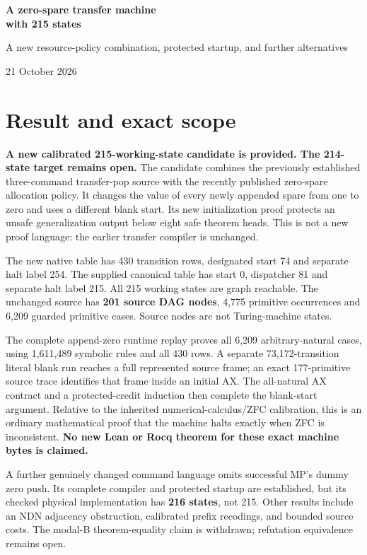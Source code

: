 \documentclass[11pt]{article}
\begin{document}
{\LARGE\bfseries A zero-spare transfer machine\\with 215 states}\par
\vspace{5pt}
{\large A new resource-policy combination, protected startup, and further alternatives}\par
21 October 2026\par

\section{Result and exact scope}
\textbf{A new calibrated 215-working-state candidate is provided. The 214-state target remains open.} The candidate combines the previously established three-command transfer-pop source with the recently published zero-spare allocation policy. It changes the value of every newly appended spare from one to zero and uses a different blank start. Its new initialization proof protects an unsafe generalization output below eight safe theorem heads. This is not a new proof language: the earlier transfer compiler is unchanged.

The new native table has 430 transition rows, designated start 74 and separate halt label 254. The supplied canonical table has start 0, dispatcher 81 and separate halt label 215. All 215 working states are graph reachable. The unchanged source has \textbf{201 source DAG nodes}, 4,775 primitive occurrences and 6,209 guarded primitive cases. Source nodes are not Turing-machine states.

The complete append-zero runtime replay proves all 6,209 arbitrary-natural cases, using 1,611,489 symbolic rules and all 430 rows. A separate 73,172-transition literal blank run reaches a full represented source frame; an exact 177-primitive source trace identifies that frame inside an initial AX. The all-natural AX contract and a protected-credit induction then complete the blank-start argument. Relative to the inherited numerical-calculus/ZFC calibration, this is an ordinary mathematical proof that the machine halts exactly when ZFC is inconsistent. \textbf{No new Lean or Rocq theorem for these exact machine bytes is claimed.}

A further genuinely changed command language omits successful MP's dummy zero push. Its complete compiler and protected startup are established, but its checked physical implementation has \textbf{216 states}, not 215. Other results include an NDN adjacency obstruction, calibrated prefix recodings, and bounded source costs. The modal-B theorem-equality claim is withdrawn; refutation equivalence remains open.
\end{document}

